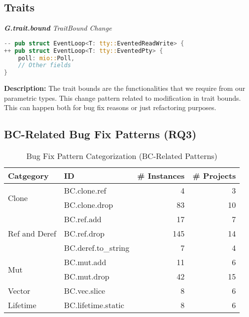 \subsection{Traits}
\noindent \textit{ \textbf{G.trait.bound} TraitBound Change}

\begin{lstlisting}[language=Rust, style=colouredRust]
-- pub struct EventLoop<T: tty::EventedReadWrite> {
++ pub struct EventLoop<T: tty::EventedPty> {
    poll: mio::Poll,
    // Other fields
}

\end{lstlisting}

\noindent \textbf{Description:} The trait bounds are the functionalities that we require from our parametric types. This change pattern related to modification in trait bounds. This can happen both for bug fix reasons or just refactoring purposes.

\subsection{\label{sec:bc_patterns}BC-Related Bug Fix Patterns (RQ3)}


\begin{table}[]
\begin{tabular}{l|l|r|r}
\textbf{Catgegory} & \textbf{ID} & \textbf{\# Instances} & \textbf{\# Projects} \\
\hline
\multirow{2}{*}{Clone}                                         & BC.clone.ref & 4 & 3 \\
& BC.clone.drop & 83 & 10   
\\\cline{1-4}
\multirow{3}{*}{Ref and Deref} & BC.ref.add & 17 & 7 \\
& BC.ref.drop & 145 & 14 \\
& BC.deref.to\_string  & 7 & 4                                            \\\cline{1-4}
\multirow{2}{*}{Mut} & BC.mut.add  & 11 & 6 \\
& BC.mut.drop  & 42 & 15                               \\\cline{1-4}
Vector & BC.vec.slice  & 8 & 6                                    \\\cline{1-4}
\multirow{1}{*}{Lifetime}      
& BC.lifetime.static  & 8 & 6
\\
\end{tabular}
\caption{\label{table:bc}Bug Fix Pattern Categorization (BC-Related Patterns)}
\end{table}
    

